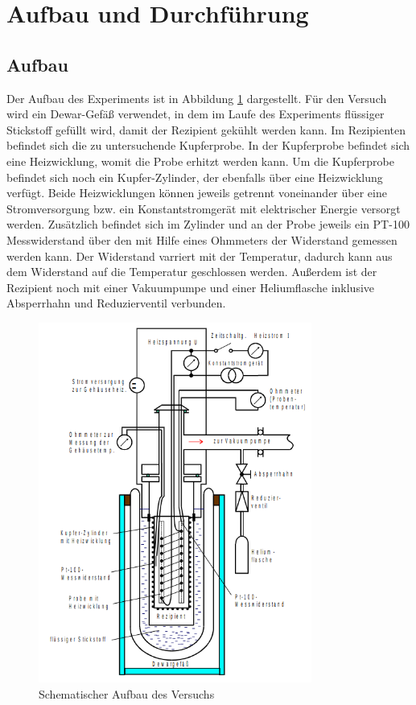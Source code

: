\section{Aufbau und Durchführung}
\label{sec:AundD}

\subsection{Aufbau}
\label{sec:Aufbau}

Der Aufbau des Experiments ist in Abbildung \ref{fig:aufbau} dargestellt. Für den Versuch wird ein Dewar-Gefäß verwendet, in dem im Laufe des Experiments flüssiger Stickstoff gefüllt wird, damit der
Rezipient gekühlt werden kann. Im Rezipienten befindet sich die zu untersuchende Kupferprobe. In der Kupferprobe befindet sich eine Heizwicklung, womit die Probe erhitzt werden kann. Um die Kupferprobe befindet sich noch ein Kupfer-Zylinder, der ebenfalls über eine Heizwicklung verfügt. Beide Heizwicklungen können jeweils getrennt voneinander über eine Stromversorgung bzw. ein Konstantstromgerät mit elektrischer Energie versorgt werden. Zusätzlich befindet sich im Zylinder und an der Probe jeweils ein PT-100 Messwiderstand über den mit Hilfe eines Ohmmeters der Widerstand gemessen werden kann. Der Widerstand varriert mit der Temperatur, dadurch kann aus dem Widerstand auf die Temperatur geschlossen werden. Außerdem ist der Rezipient noch mit einer Vakuumpumpe und einer Heliumflasche inklusive Absperrhahn und Reduzierventil verbunden. 

\begin{figure}[H]
    \centering
    \includegraphics[width=0.8\textwidth]{build/Aufbau.PNG}
    \caption{Schematischer Aufbau des Versuchs \cite{Anleitung}}
    \label{fig:aufbau}
\end{figure}

